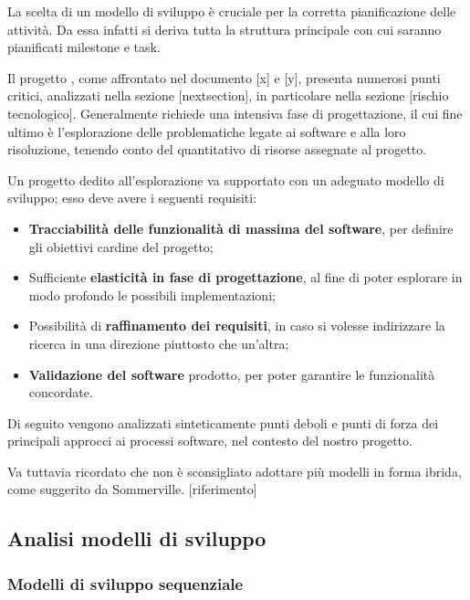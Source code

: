 	La scelta di un modello di sviluppo è cruciale per la corretta pianificazione delle attività. Da essa infatti si deriva tutta la struttura principale con cui saranno pianificati milestone e task.

	Il progetto {\proj}, come affrontato nel documento [x] e [y], presenta numerosi punti critici, analizzati nella sezione [nextsection], in particolare nella sezione [rischio tecnologico]. Generalmente {\proj} richiede una intensiva fase di progettazione, il cui fine ultimo è l'esplorazione delle problematiche legate ai software  e alla loro risoluzione, tenendo conto del quantitativo di risorse assegnate al progetto. %

	Un progetto dedito all'esplorazione va supportato con un adeguato modello di sviluppo; esso deve avere i seguenti requisiti:

	\begin{itemize}
		\item \textbf{Tracciabilità delle funzionalità di massima del software}, per definire gli obiettivi cardine del progetto;
		\item Sufficiente \textbf{elasticità in fase di progettazione}, al fine di poter esplorare in modo profondo le possibili implementazioni;
		\item Possibilità di \textbf{raffinamento dei requisiti}, in caso si volesse indirizzare la ricerca in una direzione piuttosto che un'altra;
		\item \textbf{Validazione del software} prodotto, per poter garantire le funzionalità concordate.
	\end{itemize}

	Di seguito vengono analizzati sinteticamente punti deboli e punti di forza dei principali approcci ai processi software, nel contesto del nostro progetto.
	
	Va tuttavia ricordato che non è sconsigliato adottare più modelli in forma ibrida, come suggerito da Sommerville. [riferimento]

	\subsection{Analisi modelli di sviluppo}

		\subsubsection{Modelli di sviluppo sequenziale}

